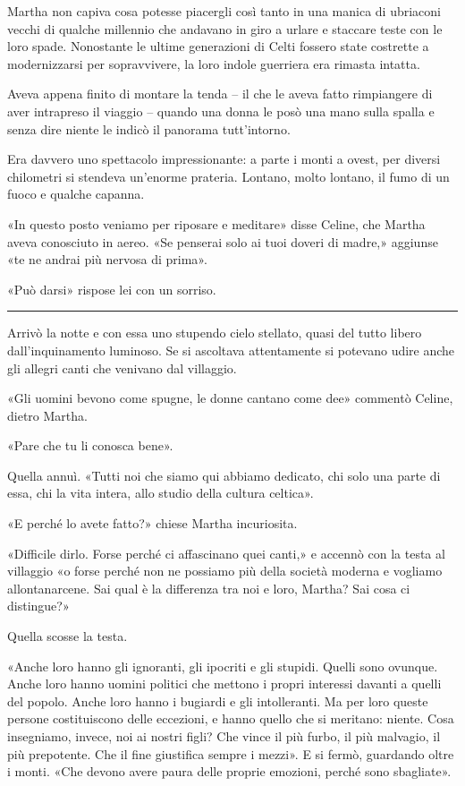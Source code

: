 \documentclass[a4paper,11pt,oneside,openright,final]{memoir}
\begin{document}
Martha non capiva cosa potesse piacergli così tanto in una manica di ubriaconi
vecchi di qualche millennio che andavano in giro a urlare e staccare teste con
le loro spade. Nonostante le ultime generazioni di Celti fossero state costrette
a modernizzarsi per sopravvivere, la loro indole guerriera era rimasta intatta.

Aveva appena finito di montare la tenda -- il che le aveva fatto rimpiangere di
aver intrapreso il viaggio -- quando una donna le posò una mano sulla spalla e
senza dire niente le indicò il panorama tutt'intorno.

Era davvero uno spettacolo impressionante: a parte i monti a ovest, per diversi
chilometri si stendeva un'enorme prateria. Lontano, molto lontano, il fumo di un
fuoco e qualche capanna.

«In questo posto veniamo per riposare e meditare» disse Celine, che Martha
aveva conosciuto in aereo. «Se penserai solo ai tuoi doveri di madre,»
aggiunse «te ne andrai più nervosa di prima».

«Può darsi» rispose lei con un sorriso.

\plainbreak{1}

Arrivò la notte e con essa uno stupendo cielo stellato, quasi del tutto libero
dall'inquinamento luminoso. Se si ascoltava attentamente si potevano udire anche
gli allegri canti che venivano dal villaggio.

«Gli uomini bevono come spugne, le donne cantano come dee» commentò Celine,
dietro Martha.

«Pare che tu li conosca bene».

Quella annuì. «Tutti noi che siamo qui abbiamo dedicato, chi solo una parte di
essa, chi la vita intera, allo studio della cultura celtica».

«E perché lo avete fatto?» chiese Martha incuriosita.

«Difficile dirlo. Forse perché ci affascinano quei canti,» e accennò con la
testa al villaggio «o forse perché non ne possiamo più della società moderna
e vogliamo allontanarcene. Sai qual è la differenza tra noi e loro, Martha? Sai
cosa ci distingue?»

Quella scosse la testa.

«Anche loro hanno gli ignoranti, gli ipocriti e gli stupidi. Quelli sono
ovunque. Anche loro hanno uomini politici che mettono i propri interessi davanti
a quelli del popolo. Anche loro hanno i bugiardi e gli intolleranti. Ma per loro
queste persone costituiscono delle eccezioni, e hanno quello che si meritano:
niente. Cosa insegniamo, invece, noi ai nostri figli? Che vince il più furbo,
il più malvagio, il più prepotente. Che il fine giustifica sempre i mezzi». E
si fermò, guardando oltre i monti. «Che devono avere paura delle proprie
emozioni, perché sono sbagliate».
\end{document}
